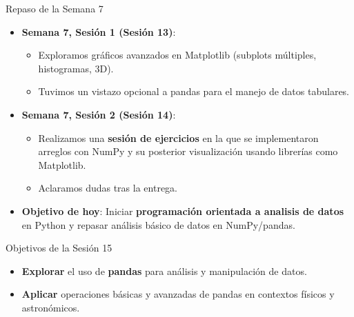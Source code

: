 \documentclass[10pt]{beamer}
\begin{document}
\begin{frame}{Repaso de la Semana 7}
  \begin{itemize}
    \item \textbf{Semana 7, Sesión 1 (Sesión 13)}:
      \begin{itemize}
        \item Exploramos gráficos avanzados en Matplotlib (subplots múltiples, histogramas, 3D).
        \item Tuvimos un vistazo opcional a pandas para el manejo de datos tabulares.
      \end{itemize}
    \item \textbf{Semana 7, Sesión 2 (Sesión 14)}:
      \begin{itemize}
        \item Realizamos una \textbf{sesión de ejercicios} en la que se implementaron arreglos con NumPy y su posterior visualización usando librerías como Matplotlib.
        \item Aclaramos dudas tras la entrega.
      \end{itemize}
    \item \textbf{Objetivo de hoy}: Iniciar \textbf{programación orientada a analisis de datos} en Python y repasar análisis básico de datos en NumPy/pandas.
  \end{itemize}
\end{frame}

\begin{frame}{Objetivos de la Sesión 15}
  \begin{itemize}
    \item \textbf{Explorar} el uso de \textbf{pandas} para análisis y manipulación de datos.
    \item \textbf{Aplicar} operaciones básicas y avanzadas de pandas en contextos físicos y astronómicos.
  \end{itemize}
\end{frame}



\end{document}

